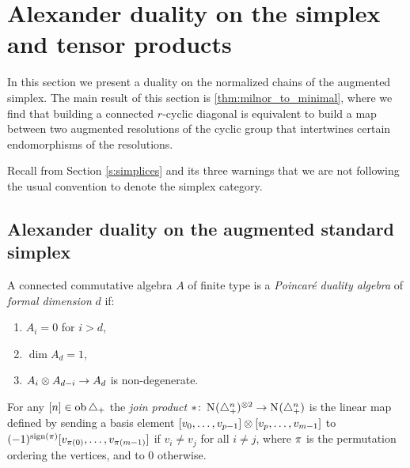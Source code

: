 
\section{Alexander duality on the simplex and tensor products}\label{s:3complexes}

In this section we present a duality on the normalized chains of the augmented simplex. The main result of this section is \cref{thm:milnor_to_minimal}, where we find that building a connected $r$-cyclic diagonal is equivalent to build a map between two augmented resolutions of the cyclic group that intertwines certain endomorphisms of the resolutions. 

\begin{warning}
	Recall from Section \cref{s:simplices} and its three warnings that we are not following the usual convention to denote the simplex category.
\end{warning}
\subsection{Alexander duality on the augmented standard simplex}\label{s:alexander}


\begin{definition}\label{d:poincare_duality_algebra}
	A connected commutative algebra $A$ of finite type is a \emph{Poincar\'e duality algebra} of \emph{formal dimension} $d$ if:
	\begin{enumerate}
		\item\label{i:pd1} $A_i = 0$ for $i > d$,
		\item\label{i:pd2} $\dim A_d = 1$,
		\item\label{i:pd3} $A_i \otimes A_{d-i} \to A_d$ is non-degenerate.
	\end{enumerate}
\end{definition}

\begin{definition}\label{def:join_product}
	For any $[n] \in \operatorname{ob}\triangle_{+}$ the \textit{join product} $\ast \colon \operatorname{N}_{}(\triangle_{+}^{n})^{\otimes 2} \to \operatorname{N}_{}(\triangle_{+}^{n})$ is the linear map defined by sending a basis element $[v_0, \dots, v_{p-1}] \otimes [v_{p},\dots,v_{m-1}]$ to $(-1)^{\operatorname{sign}(\pi)}[v_{\pi(0)}, \dots, v_{\pi(m-1)}]$	if $v_i \neq v_j$ for all $i \neq j$, where $\pi$ is the permutation ordering the vertices, and to $0$ otherwise. 
\end{definition}

